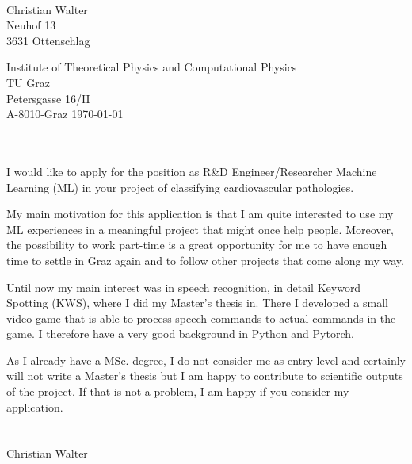 \documentclass[11pt, a4paper]{article}
\begin{document}
\vspace*{1cm}
\begin{center}
  \\
\end{center}

\vspace{1cm}
Christian Walter\\
Neuhof 13\\
3631 Ottenschlag\\
\vspace{1cm}

Institute of Theoretical Physics and Computational Physics\\ 
TU Graz\\
Petersgasse 16/II\\
A-8010-Graz
\hfill
\today\\
\vspace{1cm}

\\\\
I would like to apply for the position as R\&D Engineer/Researcher Machine Learning (ML) in your project of classifying cardiovascular pathologies.

My main motivation for this application is that I am quite interested to use my ML experiences in a meaningful project that might once help people.
Moreover, the possibility to work part-time is a great opportunity for me to have enough time to settle in Graz again and to follow other projects that come along my way.

Until now my main interest was in speech recognition, in detail Keyword Spotting (KWS), where I did my Master's thesis in. There I developed a small video game that is able to process speech commands to actual commands in the game. I therefore have a very good background in Python and Pytorch.

As I already have a MSc. degree, I do not consider me as entry level and certainly will not write a Master's thesis but I am happy to contribute to scientific outputs of the project. If that is not a problem, I am happy if you consider my application.\\

\\\\ Christian Walter
\end{document}
